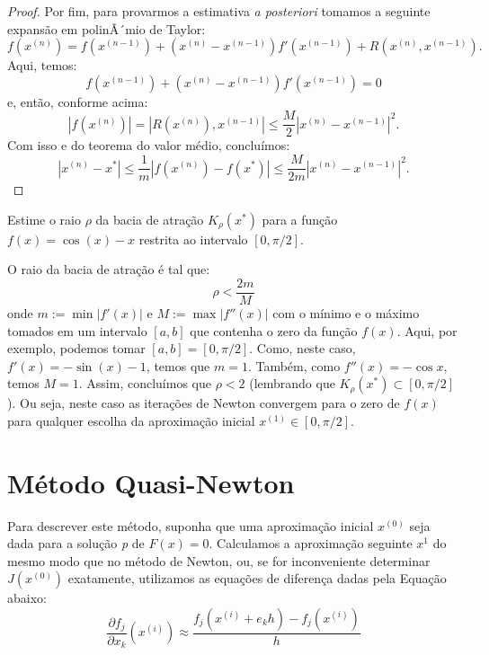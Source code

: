\documentclass[
	12pt,				%
	oneside,			%
	a4paper,			%
	english,			%
	french,				%
	spanish,			%
	brazil				%
	]{abntex2}
\begin{document}
\begin{proof}
Por fim, para provarmos a estimativa \emph{a posteriori} tomamos a seguinte expansão em polinÃ´mio de Taylor:
\begin{equation}
  f(x^{(n)}) = f(x^{(n-1)}) + (x^{(n)} - x^{(n-1)})f'(x^{(n-1)}) + R(x^{(n)},x^{(n-1)}).
\end{equation}
Aqui, temos:
\begin{equation}
  f(x^{(n-1)}) + (x^{(n)} - x^{(n-1)})f'(x^{(n-1)}) = 0
\end{equation}
e, então, conforme acima:
\begin{equation}
  |f(x^{(n)})| = |R(x^{(n)}),x^{(n-1)}| \leq \dfrac{M}{2}|x^{(n)} - x^{(n-1)}|^2.
\end{equation}
Com isso e do teorema do valor médio, concluímos:
\begin{equation}
  |x^{(n)} - x^*| \leq \dfrac{1}{m}|f(x^{(n)}) - f(x^*)| \leq \dfrac{M}{2m}|x^{(n)} - x^{(n-1)}|^2.
\end{equation}
\end{proof}

\begin{ex}
  Estime o raio $\rho$ da bacia de atração $K_\rho(x^*)$ para a função $f(x) = \cos(x) - x$ restrita ao intervalo $[0, \pi/2]$.
\end{ex}
\begin{sol}
  O raio da bacia de atração é tal que:
  \begin{equation}
    \rho < \dfrac{2m}{M}
  \end{equation}
onde $m := \min |f'(x)|$ e $M := \max |f''(x)|$ com o mínimo e o máximo tomados em um intervalo $[a, b]$ que contenha o zero da função $f(x)$. Aqui, por exemplo, podemos tomar $[a, b] = [0, \pi/2]$. Como, neste caso, $f'(x) = -\sin(x) - 1$, temos que $m = 1$. Também, como $f''(x) = -\cos x$, temos $M = 1$. Assim, concluímos que $\rho < 2$ (lembrando que $K_\rho(x^*)\subset [0, \pi/2]$). Ou seja, neste caso as iterações de Newton convergem para o zero de $f(x)$ para qualquer escolha da aproximação inicial $x^{(1)}\in [0, \pi/2]$.
\end{sol}

\section{Método Quasi-Newton}
Para descrever este método, suponha que uma aproximação inicial $x^{(0)}$ seja dada para a solução \textit{p} de $F\left(x\right)=0$. Calculamos a aproximação seguinte $x^{{1}}$ do mesmo modo que no método de Newton, ou, se for inconveniente determinar $J\left(x^{(0)}\right)$ exatamente, utilizamos as equações de diferença dadas pela Equação abaixo:
$$\dfrac{\partial f_j}{\partial x_k}\left(x^{(i)}\right)\approx\dfrac{f_j\left(x^{(i)}+e_kh
\right)-f_j\left(x^{(i)}\right)}{h}$$
\end{document}

